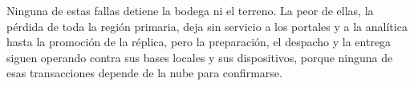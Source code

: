 Ninguna de estas fallas detiene la bodega ni el terreno. La peor de ellas, la pérdida de toda la región primaria, deja sin servicio a los portales y a la analítica hasta la promoción de la réplica, pero la preparación, el despacho y la entrega siguen operando contra sus bases locales y sus dispositivos, porque ninguna de esas transacciones depende de la nube para confirmarse.
